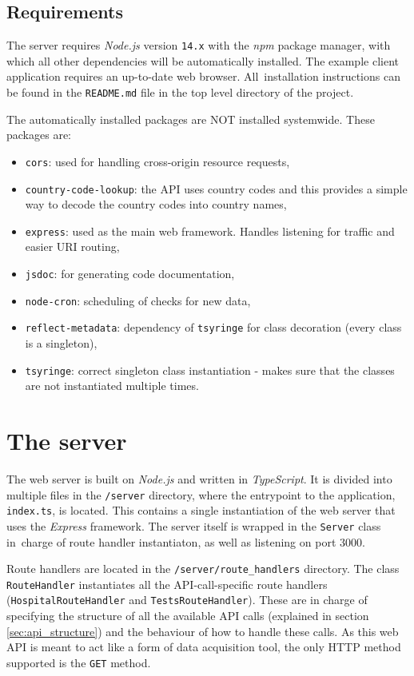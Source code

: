 \documentclass[pdftex, 11pt, a4paper]{article}
\newcommand{\code}{\texttt}
\begin{document}
    \subsection{Requirements}
    The server requires \emph{Node.js} version \code{14.x} with the \emph{npm} package manager, with which
    all other dependencies will be automatically installed. The example client
    application requires an up-to-date web browser. All~installation instructions
    can be found in the \code{README.md} file in the top level directory of the project.

    The automatically installed packages are NOT installed systemwide. These packages are:
    \begin{itemize}
        \item \code{cors}: used for handling cross-origin resource requests,
        \item \code{country-code-lookup}: the API uses country codes and this provides a simple
            way to decode the country codes into country names,
        \item \code{express}: used as the main web framework. Handles listening for traffic and
            easier URI routing,
        \item \code{jsdoc}: for generating code documentation,
        \item \code{node-cron}: scheduling of checks for new data,
        \item \code{reflect-metadata}: dependency of \code{tsyringe} for class decoration (every class
            is a singleton),
        \item \code{tsyringe}: correct singleton class instantiation - makes sure
            that the classes are not instantiated multiple times.
    \end{itemize}

    \section{The server}
    The web server is built on \emph{Node.js} and written in \emph{TypeScript}.
    It is divided into multiple files in the \code{/server} directory, where
    the entrypoint to the application, \code{index.ts}, is located. This contains
    a single instantiation of the web server that uses the \emph{Express} framework.
    The server itself is wrapped in the \code{Server} class in~charge of route handler
    instantiaton, as well as listening on port 3000.

    Route handlers are located in the \code{/server/route\_handlers} directory.
    The class \code{RouteHandler} instantiates all the API-call-specific route handlers
    (\code{HospitalRouteHandler} and \code{TestsRouteHandler}). These are in charge of
    specifying the structure of all the available API calls (explained in section
    \ref{sec:api_structure}) and the behaviour of how to handle these calls. As this web
    API is meant to act like a form of data acquisition tool, the only HTTP method
    supported is the \code{GET} method.
\end{document}
